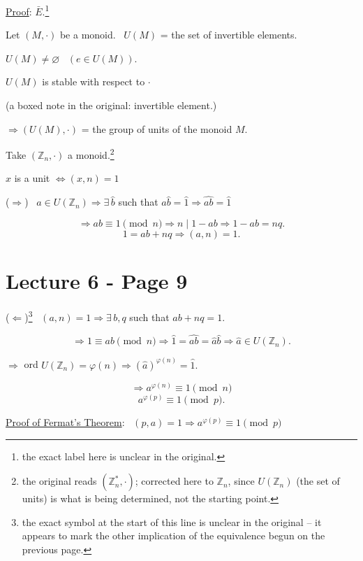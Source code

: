 \bigskip
\noindent\underline{Proof}: $\bar E$.\footnote{the exact label here is unclear in the original.}

\noindent Let $(M,\cdot)$ be a monoid. \ $U(M)$ = the set of invertible elements.

\bigskip
\noindent $U(M)\neq\varnothing$ \ $(e\in U(M))$.

\noindent $U(M)$ is stable with respect to $\cdot$

\noindent (a boxed note in the original: invertible element.)

\bigskip
\noindent $\Rightarrow (U(M),\cdot)$ = the group of units of the monoid $M$.

\bigskip
\noindent Take $(\mathbb{Z}_n,\cdot)$ a monoid.\footnote{the original reads $(\mathbb{Z}_n^*,\cdot)$; corrected here to $\mathbb{Z}_n$, since $U(\mathbb{Z}_n)$ (the set of units) is what is being determined, not the starting point.}

\bigskip
\noindent $\hat x$ is a unit $\Leftrightarrow (x,n)=1$

\bigskip
\noindent ($\Rightarrow$) \ $\hat a\in U(\mathbb{Z}_n) \Rightarrow \exists\,\hat b$ such that $\hat a\hat b=\hat 1 \Rightarrow \widehat{ab}=\hat 1$

\[
\Rightarrow ab\equiv 1 \pmod n \Rightarrow n\mid 1-ab \Rightarrow 1-ab=nq.
\]
\[
1=ab+nq \Rightarrow (a,n)=1.
\]



\section*{Lecture 6 - Page 9}

\noindent ($\Leftarrow$)\footnote{the exact symbol at the start of this line is unclear in the original -- it appears to mark the other implication of the equivalence begun on the previous page.} \ $(a,n)=1 \Rightarrow \exists\,b,q$ such that $ab+nq=1$.

\[
\Rightarrow 1\equiv ab \pmod n \Rightarrow \hat 1=\widehat{ab}=\hat a\hat b \Rightarrow \hat a\in U(\mathbb{Z}_n).
\]

\bigskip
\noindent $\Rightarrow$ ord $U(\mathbb{Z}_n) = \varphi(n) \Rightarrow (\hat a)^{\varphi(n)} = \hat 1.$

\[
\Rightarrow a^{\varphi(n)} \equiv 1 \pmod n
\]
\[
a^{\varphi(p)} \equiv 1 \pmod p.
\]

\bigskip
\noindent\underline{Proof of Fermat's Theorem}: \ $(p,a)=1 \Rightarrow a^{\varphi(p)}\equiv 1 \pmod p$

